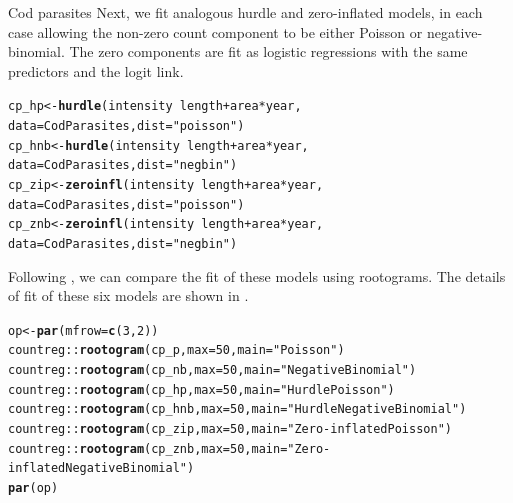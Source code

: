 \documentclass[11pt]{book}\usepackage[]{graphicx}\usepackage[]{color}
\makeatletter
\newcommand{\hlnum}[1]{\textcolor[rgb]{0.686,0.059,0.569}{#1}}%
\newcommand{\hlstr}[1]{\textcolor[rgb]{0.192,0.494,0.8}{#1}}%
\newcommand{\hlopt}[1]{\textcolor[rgb]{0,0,0}{#1}}%
\newcommand{\hlstd}[1]{\textcolor[rgb]{0.345,0.345,0.345}{#1}}%
\newcommand{\hlkwb}[1]{\textcolor[rgb]{0.69,0.353,0.396}{#1}}%
\newcommand{\hlkwc}[1]{\textcolor[rgb]{0.333,0.667,0.333}{#1}}%
\newcommand{\hlkwd}[1]{\textcolor[rgb]{0.737,0.353,0.396}{\textbf{#1}}}%
\newenvironment{kframe}{%
 \def\at@end@of@kframe{}%
 \ifinner\ifhmode%
  \def\at@end@of@kframe{\end{minipage}}%
  \begin{minipage}{\columnwidth}%
 \fi\fi%
 \def\FrameCommand##1{\hskip\@totalleftmargin \hskip-\fboxsep
 \colorbox{shadecolor}{##1}\hskip-\fboxsep
     \hskip-\linewidth \hskip-\@totalleftmargin \hskip\columnwidth}%
 \MakeFramed {\advance\hsize-\width
   \@totalleftmargin\z@ \linewidth\hsize
   \@setminipage}}%
 {\par\unskip\endMakeFramed%
 \at@end@of@kframe}
\newenvironment{knitrout}{}{} %
\renewenvironment{knitrout}{\small\renewcommand{\baselinestretch}{.85}}{} %
\makeatother
\begin{document}
\begin{Example}[cod2]{Cod parasites}
Next, we fit analogous hurdle and zero-inflated models, in each case allowing the non-zero
count component to be either Poisson or negative-binomial. The zero components are fit
as logistic regressions with the same predictors and the logit link.
\begin{knitrout}
\color{fgcolor}\begin{kframe}
\begin{alltt}
\hlstd{cp_hp}  \hlkwb{<-} \hlkwd{hurdle}\hlstd{(intensity} \hlopt{~} \hlstd{length} \hlopt{+} \hlstd{area} \hlopt{*} \hlstd{year,}
                 \hlkwc{data} \hlstd{= CodParasites,} \hlkwc{dist} \hlstd{=} \hlstr{"poisson"}\hlstd{)}
\hlstd{cp_hnb} \hlkwb{<-} \hlkwd{hurdle}\hlstd{(intensity} \hlopt{~} \hlstd{length} \hlopt{+} \hlstd{area} \hlopt{*} \hlstd{year,}
                 \hlkwc{data} \hlstd{= CodParasites,} \hlkwc{dist} \hlstd{=} \hlstr{"negbin"}\hlstd{)}
\hlstd{cp_zip} \hlkwb{<-} \hlkwd{zeroinfl}\hlstd{(intensity} \hlopt{~} \hlstd{length} \hlopt{+} \hlstd{area} \hlopt{*} \hlstd{year,}
                   \hlkwc{data} \hlstd{= CodParasites,} \hlkwc{dist} \hlstd{=} \hlstr{"poisson"}\hlstd{)}
\hlstd{cp_znb} \hlkwb{<-} \hlkwd{zeroinfl}\hlstd{(intensity} \hlopt{~} \hlstd{length} \hlopt{+} \hlstd{area} \hlopt{*} \hlstd{year,}
                   \hlkwc{data} \hlstd{= CodParasites,} \hlkwc{dist} \hlstd{=} \hlstr{"negbin"}\hlstd{)}
\end{alltt}
\end{kframe}
\end{knitrout}
Following , we can compare the fit of these models using rootograms.
The details of fit of these six models are shown in .
\begin{knitrout}
\color{fgcolor}\begin{kframe}
\begin{alltt}
\hlstd{op} \hlkwb{<-} \hlkwd{par}\hlstd{(}\hlkwc{mfrow} \hlstd{=} \hlkwd{c}\hlstd{(}\hlnum{3}\hlstd{,} \hlnum{2}\hlstd{))}
\hlstd{countreg}\hlopt{::}\hlkwd{rootogram}\hlstd{(cp_p,} \hlkwc{max} \hlstd{=} \hlnum{50}\hlstd{,} \hlkwc{main} \hlstd{=} \hlstr{"Poisson"}\hlstd{)}
\hlstd{countreg}\hlopt{::}\hlkwd{rootogram}\hlstd{(cp_nb,} \hlkwc{max} \hlstd{=} \hlnum{50}\hlstd{,} \hlkwc{main} \hlstd{=} \hlstr{"Negative Binomial"}\hlstd{)}
\hlstd{countreg}\hlopt{::}\hlkwd{rootogram}\hlstd{(cp_hp,} \hlkwc{max} \hlstd{=} \hlnum{50}\hlstd{,} \hlkwc{main} \hlstd{=} \hlstr{"Hurdle Poisson"}\hlstd{)}
\hlstd{countreg}\hlopt{::}\hlkwd{rootogram}\hlstd{(cp_hnb,} \hlkwc{max} \hlstd{=} \hlnum{50}\hlstd{,} \hlkwc{main} \hlstd{=} \hlstr{"Hurdle Negative Binomial"}\hlstd{)}
\hlstd{countreg}\hlopt{::}\hlkwd{rootogram}\hlstd{(cp_zip,} \hlkwc{max} \hlstd{=} \hlnum{50}\hlstd{,} \hlkwc{main} \hlstd{=} \hlstr{"Zero-inflated Poisson"}\hlstd{)}
\hlstd{countreg}\hlopt{::}\hlkwd{rootogram}\hlstd{(cp_znb,} \hlkwc{max} \hlstd{=} \hlnum{50}\hlstd{,} \hlkwc{main} \hlstd{=} \hlstr{"Zero-inflated Negative Binomial"}\hlstd{)}
\hlkwd{par}\hlstd{(op)}
\end{alltt}
\end{kframe}\begin{figure}[!htbp]


\end{figure}
\end{knitrout}
\end{Example}
\end{document}
